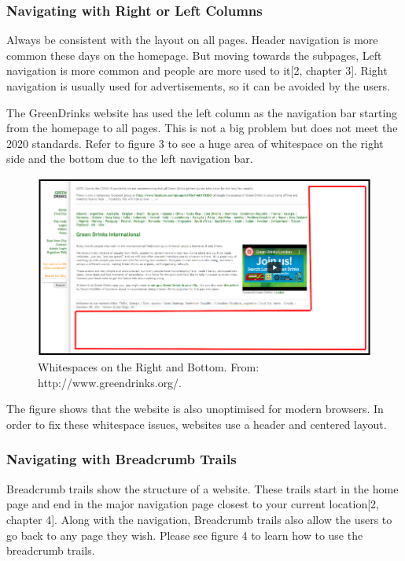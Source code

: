 \documentclass[12pt]{article}
\begin{document}
\subsubsection*{Navigating with Right or Left Columns}	
Always be consistent with the layout on all pages. Header navigation is more common these days on the homepage. But moving towards the subpages, Left navigation is more common and people are more used to it[2, chapter 3]. Right navigation is usually used for advertisements, so it can be avoided by the users. 

The GreenDrinks website has used the left column as the navigation bar starting from the homepage to all pages. This is not a big problem but does not meet the 2020 standards. Refer to figure 3 to see a huge area of whitespace on the right side and the bottom due to the left navigation bar.

\begin{figure}[ht]
\centering
\includegraphics[width=1.0\textwidth]{f3}
\caption[Whitespaces on the Right and Bottom.]{Whitespaces on the Right and Bottom. From: http://www.greendrinks.org/\footnotemark.}
\end{figure}
 
	
The figure shows that the website is also unoptimised for modern browsers. In order to fix these whitespace issues, websites use a header and centered layout.

\subsubsection*{Navigating with Breadcrumb Trails}	
Breadcrumb trails show the structure of a website. These trails start in the home page and end in the major navigation page closest to your current location[2, chapter 4]. Along with the navigation, Breadcrumb trails also allow the users to go back to any page they wish. Please see figure 4 to learn how to use the breadcrumb trails.
\end{document}
